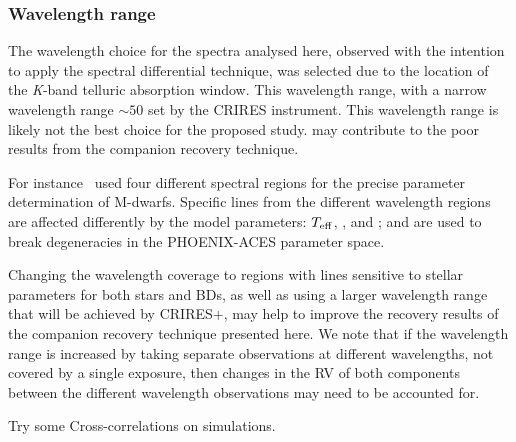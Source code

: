 \subsubsection{Wavelength range}
The wavelength choice for the spectra analysed here, observed with the intention to apply the spectral differential technique, was selected due to the location of the \emph{K}-band telluric absorption window.
This wavelength range, with a narrow wavelength range \(\sim50\)\nm{} set by the {CRIRES} instrument.
This wavelength range is likely not the best choice for the proposed study.  may contribute to the poor results from the companion recovery technique.

For instance~\citet{passegger_fundamental_2016} used four different spectral regions for the precise parameter determination of M-dwarfs.
Specific lines from the different wavelength regions are affected differently by the model parameters: \(T_{\mathrm{eff}}{}\), \logg{}, and \feh{}; and are used to break degeneracies in the {PHOENIX-ACES} parameter space.

Changing the wavelength coverage to regions with lines sensitive to stellar parameters for both stars and BDs, as well as using a larger wavelength range that will be achieved by {CRIRES+}, may help to improve the recovery results of the companion recovery technique presented here.
We note that if the wavelength range is increased by taking separate observations at different wavelengths, not covered by a single exposure, then changes in the {RV} of both components between the different wavelength observations may need to be accounted for.







Try some Cross-correlations on simulations.


